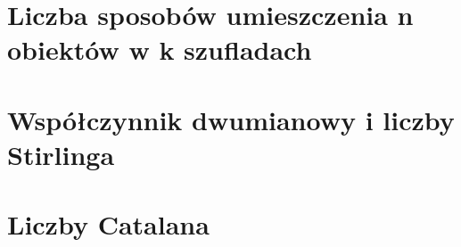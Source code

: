 \section{Liczba sposobów umieszczenia n obiektów w k szufladach}


\section{Współczynnik dwumianowy i liczby Stirlinga}


\section{Liczby Catalana}
